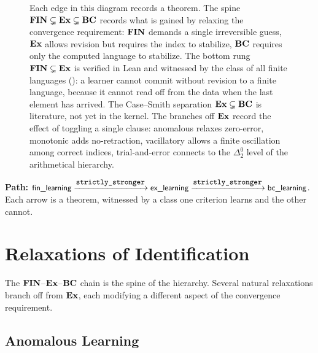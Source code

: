 \begin{figure}[ht]
\begin{tikzpicture}
\end{tikzpicture}
\caption[The identification hierarchy as a chain of separations]{Each edge in this diagram records a theorem. The spine $\mathbf{FIN}\subsetneq\mathbf{Ex}\subsetneq\mathbf{BC}$ records what is gained by relaxing the convergence requirement: $\mathbf{FIN}$ demands a single irreversible guess, $\mathbf{Ex}$ allows revision but requires the index to stabilize, $\mathbf{BC}$ requires only the computed language to stabilize. The bottom rung $\mathbf{FIN}\subsetneq\mathbf{Ex}$ is verified in Lean and witnessed by the class of all finite languages (): a learner cannot commit without revision to a finite language, because it cannot read off from the data when the last element has arrived. The Case--Smith separation $\mathbf{Ex}\subsetneq\mathbf{BC}$ is literature, not yet in the kernel. The branches off $\mathbf{Ex}$ record the effect of toggling a single clause: anomalous relaxes zero-error, monotonic adds no-retraction, vacillatory allows a finite oscillation among correct indices, trial-and-error connects to the $\Delta^0_2$ level of the arithmetical hierarchy.}
\label{fig:identification-hierarchy}
\end{figure}

\begin{traversal}
\textbf{Path:} $\nde{fin\_learning} \xrightarrow{\rel{strictly\_stronger}} \nde{ex\_learning} \xrightarrow{\rel{strictly\_stronger}} \nde{bc\_learning}$.\\[3pt]
Each arrow is a theorem, witnessed by a class one criterion learns and the other cannot.
\end{traversal}


\section{Relaxations of Identification}
\label{sec:relaxations}

The $\mathbf{FIN}$--$\mathbf{Ex}$--$\mathbf{BC}$ chain is the spine of the hierarchy. Several natural relaxations branch off from $\mathbf{Ex}$, each modifying a different aspect of the convergence requirement.

\subsection{Anomalous Learning}
\label{sec:anomalous-gold}

